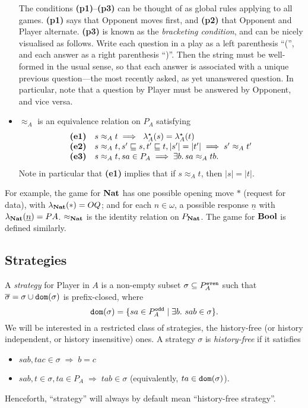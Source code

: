 \documentclass[11pt]{article}
\newcommand{\even}[1]{\mbox{$#1^{\tt even}$}}
\newcommand{\Nat}{{\bf Nat}}
\newcommand{\SET}[1]{\{ #1 \}}
\newcommand{\Deq}{\approx}
\newcommand{\Over}[1]{\overline{ #1 }}
\newcommand{\B}[1]{{\tt #1 }}
\newcommand{\THEN}{\; \Longrightarrow \;}
\begin{document}
\begin{itemize}
The conditions {\bf (p1)}--{\bf (p3)} can be thought of as global rules
applying to all games. {\bf (p1)} says that Opponent moves first, and
{\bf (p2)}  that Opponent and Player alternate. {\bf (p3)} is known as
the {\em bracketing condition}, and can be nicely visualised as follows.
Write each
question in a play as a left parenthesis ``('', and each answer as a
right parenthesis ``)''.  Then the string must be well-formed in the
usual sense, so that each answer is associated with a unique previous
question---the most recently asked, as yet unanswered question.  In
particular, note that a question by Player must be answered by
Opponent, and vice versa.

\item
$\Deq_{A}$ is an equivalence relation on $P_{A}$ satisfying
\[ \begin{array}{ll}
\mbox{{\bf (e1)}} &  s \Deq_{A} t \THEN\ \lambda_{A}^{\star}(s) = \lambda_{A}^{\star}(t) \\
\mbox{{\bf (e2)}} &  s \Deq_{A} t, s' \sqsubseteq s, t' \sqsubseteq t,
|s'| = |t'|
\THEN  s' \Deq_{A} t' \\
\mbox{{\bf (e3)}} &  s \Deq_{A} t, sa \in P_{A} \THEN \exists b. \, sa \Deq_{A} tb .
\end{array} \]
Note in particular that {\bf (e1)} implies that if $s \Deq_{A} t$, then $|s| = |t|$.
\end{itemize}
For example, the game for ${\bf Nat}$ has one possible opening move
$\ast$ (request for data), with $\lambda_{\Nat}(\ast ) = OQ
$; and for each $n \in \omega$, a possible response $\underline{n}$ with
$\lambda_{\Nat}(\underline{n}) = PA $.
${\Deq}_{\Nat}$ is the identity relation on $P_{\Nat}$.
The game for ${\bf Bool}$ is defined similarly.

\subsection{Strategies}
A {\em strategy} for Player in $A$ is a non-empty subset
$\sigma \subseteq \even{P_A}$ such that
$\Over{\sigma} = \sigma \cup \B{dom}(\sigma)$
is prefix-closed, where
\[ \B{dom}(\sigma) = \SET{sa \in P_{A}^{\B{odd}} \mid  \exists b. \
  sab \in  \sigma} . \]
We will be interested in a restricted class of strategies, the history-free
(or history independent, or history insensitive) ones.
A strategy $\sigma$ is {\em history-free} if it satisfies
\begin{itemize}
\item $sab, tac \in \sigma \THEN b=c$
\item $sab, t\in\sigma, ta\in P_A \THEN tab
  \in \sigma$ (equivalently, $ta\in \B{dom}(\sigma)$).
\end{itemize}
Henceforth, ``strategy'' will always by default mean ``history-free strategy''.
\end{document}
